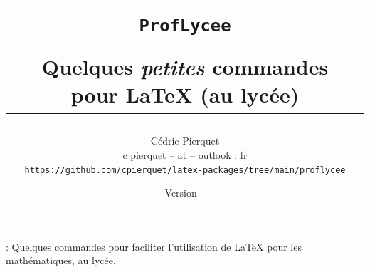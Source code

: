 \title{%
\begin{minipage}{0.85\linewidth}
	\begin{tcolorbox}[colframe=yellow,colback=yellow!15]
		\begin{center}
			\begin{tabular}{c}
				\lstinline!ProfLycee!\\
				\\
				Quelques \textit{petites} commandes pour  \LaTeX{} (au lycée)
			\end{tabular}
		\end{center}
	\end{tcolorbox}
\end{minipage}
}
\author{
\begin{tabular}{c}
	Cédric Pierquet\\
	{\ttfamily c pierquet -- at -- outlook . fr}\\
	\texttt{\url{https://github.com/cpierquet/latex-packages/tree/main/proflycee}}
\end{tabular}
}
\date{Version \PLversion{} -- \PLdate}

\newcommand\Cle[1]{{\bfseries\sffamily\textlangle \textcolor{orange!75!black}{#1}\textrangle}}
\newcommand\deblst{{\tiny\faCode}~}



\setlength{\aweboxleftmargin}{0.07\linewidth}
\setlength{\aweboxcontentwidth}{0.93\linewidth}
\setlength{\aweboxvskip}{8pt}

\pagestyle{fancy}

\maketitle

\thispagestyle{empty}

{ : Quelques commandes pour faciliter l'utilisation de \LaTeX{} pour les mathématiques, au lycée.}

\medskip

